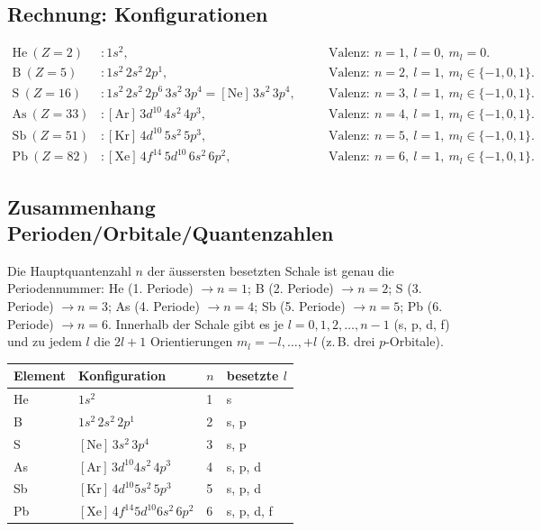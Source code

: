 
\subsection*{Rechnung: Konfigurationen}
\begin{align*}
  \mathrm{He}\ (Z=2) &: 1s^2,
    &\quad & \text{Valenz}:\ n=1,\ l=0,\ m_l = 0.\\
  \mathrm{B}\ (Z=5) &: 1s^2\,2s^2\,2p^1,
    &\quad & \text{Valenz}:\ n=2,\ l=1,\ m_l\in\{-1,0,1\}.\\
  \mathrm{S}\ (Z=16) &: 1s^2\,2s^2\,2p^6\,3s^2\,3p^4
    = \mathrm{[Ne]}\,3s^2\,3p^4,
    &\quad & \text{Valenz}:\ n=3,\ l=1,\ m_l\in\{-1,0,1\}.\\
  \mathrm{As}\ (Z=33) &: \mathrm{[Ar]}\,3d^{10}\,4s^2\,4p^3,
    &\quad & \text{Valenz}:\ n=4,\ l=1,\ m_l\in\{-1,0,1\}.\\
  \mathrm{Sb}\ (Z=51) &: \mathrm{[Kr]}\,4d^{10}\,5s^2\,5p^3,
    &\quad & \text{Valenz}:\ n=5,\ l=1,\ m_l\in\{-1,0,1\}.\\
  \mathrm{Pb}\ (Z=82) &: \mathrm{[Xe]}\,4f^{14}\,5d^{10}\,6s^2\,6p^2,
    &\quad & \text{Valenz}:\ n=6,\ l=1,\ m_l\in\{-1,0,1\}.
\end{align*}

\subsection*{Zusammenhang Perioden/Orbitale/Quantenzahlen}
Die Hauptquantenzahl $n$ der äussersten besetzten Schale ist genau die
Periodennummer: He (1. Periode) $\to n=1$; B (2. Periode) $\to n=2$;
S (3. Periode) $\to n=3$; As (4. Periode) $\to n=4$; Sb (5. Periode)
$\to n=5$; Pb (6. Periode) $\to n=6$. Innerhalb der Schale gibt es je
$l=0,1,2,\dots,n-1$ (s, p, d, f) und zu jedem $l$ die $2l+1$
Orientierungen $m_l = -l,\dots,+l$ (z.\,B. drei $p$-Orbitale).

\begin{ergebnis}
\begin{center}
\begin{tabular}{llll}
\toprule
Element & Konfiguration & $n$ & besetzte $l$ \\
\midrule
He  & $1s^2$                        & 1 & s\\
B   & $1s^2\,2s^2\,2p^1$            & 2 & s, p\\
S   & $[\mathrm{Ne}]\,3s^2\,3p^4$   & 3 & s, p\\
As  & $[\mathrm{Ar}]\,3d^{10}4s^2\,4p^3$ & 4 & s, p, d\\
Sb  & $[\mathrm{Kr}]\,4d^{10}5s^2\,5p^3$ & 5 & s, p, d\\
Pb  & $[\mathrm{Xe}]\,4f^{14}5d^{10}6s^2\,6p^2$ & 6 & s, p, d, f\\
\bottomrule
\end{tabular}
\end{center}
\end{ergebnis}

